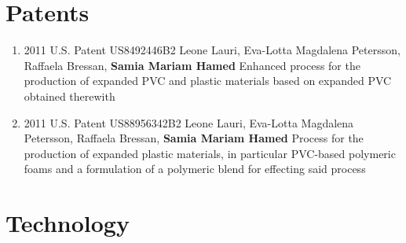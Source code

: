 \section{Patents}
\begin{enumerate}%
\item 2011 U.S. Patent US8492446B2 Leone Lauri, Eva-Lotta Magdalena Petersson, Raffaela Bressan, \textbf{Samia Mariam Hamed} {Enhanced process for the production of expanded PVC and plastic materials based on expanded PVC obtained therewith}
\item 2011 U.S. Patent US88956342B2 Leone Lauri, Eva-Lotta Magdalena Petersson, Raffaela Bressan, \textbf{Samia Mariam Hamed} {Process for the production of expanded plastic materials, in particular PVC-based polymeric foams and a formulation of a polymeric blend for effecting said process}
\end{enumerate}

\section{Technology}


